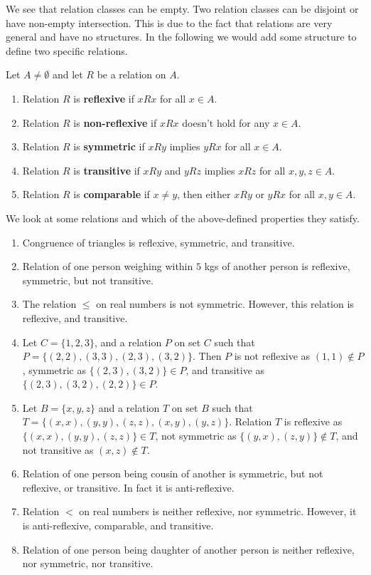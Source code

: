 \documentclass[a4paper,english,12pt]{article}
\begin{document}
We see that relation classes can be empty. Two relation classes can be disjoint or have non-empty intersection. This is due to the fact that relations are very general and have no structures. In the following we would add some structure to define two specific relations.
\begin{defn} Let $A \neq \emptyset$ and let $R$ be a relation on $A$.
	\begin{enumerate}
		\item Relation $R$ is \textbf{reflexive} if $xRx$ for all $x \in A$.
		\item Relation $R$ is \textbf{non-reflexive} if $xRx$ doesn't hold for any $x \in A$.
		\item Relation $R$ is \textbf{symmetric} if $xRy$ implies $yRx$ for all $x \in A$.
		\item Relation $R$ is \textbf{transitive} if $xRy$ and $yRz$ implies $xRz$ for all $x,y,z \in A$.
		\item Relation $R$ is \textbf{comparable} if $x \neq y$, then either $xRy$ or $yRx$ for all $x,y \in A$.
	\end{enumerate}
\end{defn}
\begin{exmp} We look at some relations and which of the above-defined properties they satisfy. 
\begin{enumerate}
	\item Congruence of triangles is reflexive, symmetric, and transitive.
	\item Relation of one person weighing within $5$ kgs of another person is reflexive, symmetric, but not transitive.
	\item The relation $\leq$ on real numbers is not symmetric. However, this relation is reflexive, and transitive. 
	\item Let $C=\{1,2,3\}$, and a relation $P$ on set $C$ such that $P=\{(2,2),(3,3),(2,3),(3,2)\}$. Then $P$ is not reflexive as $(1,1) \notin P$, symmetric as $\{(2,3),(3,2)\} \in P$, and transitive as $\{(2,3),(3,2),(2,2)\} \in P$.
	\item Let $B=\{x,y,z\}$ and a relation $T$ on set $B$ such that $T = \{(x,x),(y,y),(z,z),(x,y),(y,z)\}$. Relation $T$ is reflexive as $\{(x,x),(y,y),(z,z)\} \in T$, not symmetric as $\{(y,x),(z,y)\} \notin T$, and not transitive as $(x,z) \notin T$.
	\item Relation of one person being cousin of another is symmetric, but not reflexive, or transitive. In fact it is anti-reflexive.
	\item Relation $<$ on real numbers is neither reflexive, nor symmetric. However, it is anti-reflexive, comparable, and transitive.
	\item Relation of one person being daughter of another person is neither reflexive, nor symmetric, nor transitive.
\end{enumerate}
\end{exmp}
\end{document}
